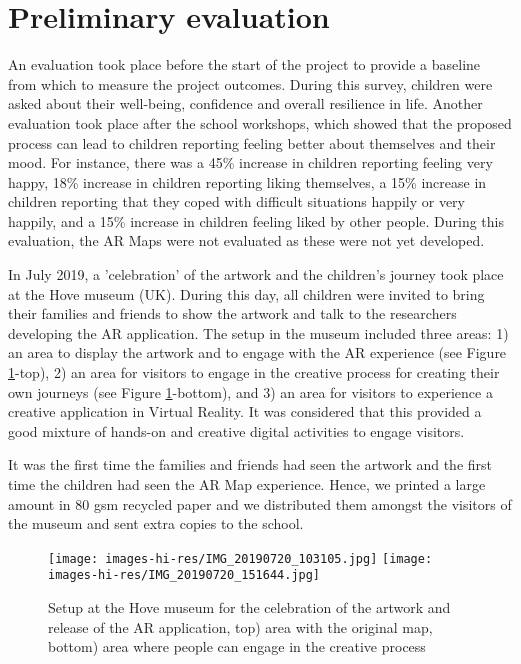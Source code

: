 \documentclass{egpubl}
\begin{document}
\section{Preliminary evaluation} \label{eval} An evaluation took place before
the start of the project to provide a baseline from which to measure the
project outcomes. During this survey, children were asked about their
well-being, confidence and overall resilience in life. Another evaluation took
place after the school workshops, which showed that the proposed process can
lead to children reporting feeling better about themselves and their mood. For
instance, there was a 45\% increase in children reporting feeling very happy,
18\% increase in children reporting liking themselves, a 15\% increase in
children reporting that they coped with difficult situations happily or very
happily, and a 15\% increase in children feeling liked by other people. During
this evaluation, the AR Maps were not evaluated as these were not yet
developed.

In July 2019, a 'celebration' of the artwork and the children's journey took
place at the Hove museum (UK). During this day, all children were invited to
bring their families and friends to show the artwork and talk to the
researchers developing the AR application. The setup in the museum included
three areas: 1) an area to display the artwork and to engage with the AR
experience (see Figure \ref{fig:museum}-top), 2) an area for visitors to
engage in the creative process for creating their own journeys (see Figure
\ref{fig:museum}-bottom), and 3) an area for visitors to experience a creative
application in Virtual Reality. It was considered that this provided a good mixture
of hands-on and creative digital activities to engage visitors.

It was the first time the families and friends had seen the artwork and the
first time the children had seen the AR Map experience. Hence, we printed a
large amount in 80 gsm recycled paper and we distributed them amongst the
visitors of the museum and sent extra copies to the school.

\begin{figure}[ht] \centering
\texttt{[image: images-hi-res/IMG\_20190720\_103105.jpg]}
\texttt{[image: images-hi-res/IMG\_20190720\_151644.jpg]}
\caption{Setup at the Hove museum for the celebration of the artwork and
release of the AR application, top) area with the original map, bottom) area
where people can engage in the creative process} \label{fig:museum}
\end{figure}
 
\end{document}
